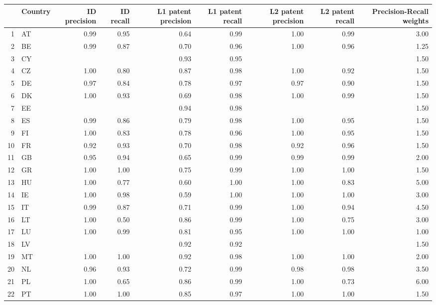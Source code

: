 \begin{table}[ht]
\centering
{\footnotesize
\begin{tabular}{rlrrrrrrr}
  \hline
 & Country & ID precision & ID recall & L1 patent precision & L1 patent recall & L2 patent precision & L2 patent recall & Precision-Recall weights \\ 
  \hline
1 & AT & 0.99 & 0.95 & 0.64 & 0.99 & 1.00 & 0.99 & 3.00 \\ 
  2 & BE & 0.99 & 0.87 & 0.70 & 0.96 & 1.00 & 0.96 & 1.25 \\ 
  3 & CY &  &  & 0.93 & 0.95 &  &  & 1.50 \\ 
  4 & CZ & 1.00 & 0.80 & 0.87 & 0.98 & 1.00 & 0.92 & 1.50 \\ 
  5 & DE & 0.97 & 0.84 & 0.78 & 0.97 & 0.97 & 0.90 & 1.50 \\ 
  6 & DK & 1.00 & 0.93 & 0.69 & 0.98 & 1.00 & 0.99 & 1.50 \\ 
  7 & EE &  &  & 0.94 & 0.98 &  &  & 1.50 \\ 
  8 & ES & 0.99 & 0.86 & 0.79 & 0.98 & 1.00 & 0.95 & 1.50 \\ 
  9 & FI & 1.00 & 0.83 & 0.78 & 0.96 & 1.00 & 0.95 & 1.50 \\ 
  10 & FR & 0.92 & 0.93 & 0.70 & 0.98 & 0.92 & 0.96 & 1.50 \\ 
  11 & GB & 0.95 & 0.94 & 0.65 & 0.99 & 0.99 & 0.99 & 2.00 \\ 
  12 & GR & 1.00 & 1.00 & 0.75 & 0.99 & 1.00 & 1.00 & 1.50 \\ 
  13 & HU & 1.00 & 0.77 & 0.60 & 1.00 & 1.00 & 0.83 & 5.00 \\ 
  14 & IE & 1.00 & 0.98 & 0.59 & 1.00 & 1.00 & 1.00 & 3.00 \\ 
  15 & IT & 0.99 & 0.87 & 0.71 & 0.99 & 1.00 & 0.94 & 4.50 \\ 
  16 & LT & 1.00 & 0.50 & 0.86 & 0.99 & 1.00 & 0.75 & 3.00 \\ 
  17 & LU & 1.00 & 0.99 & 0.81 & 0.95 & 1.00 & 1.00 & 1.00 \\ 
  18 & LV &  &  & 0.92 & 0.92 &  &  & 1.50 \\ 
  19 & MT & 1.00 & 1.00 & 0.92 & 0.98 & 1.00 & 1.00 & 2.00 \\ 
  20 & NL & 0.96 & 0.93 & 0.72 & 0.99 & 0.98 & 0.98 & 3.50 \\ 
  21 & PL & 1.00 & 0.65 & 0.86 & 0.99 & 1.00 & 0.73 & 6.00 \\ 
  22 & PT & 1.00 & 1.00 & 0.85 & 0.97 & 1.00 & 1.00 & 1.50 \\ 

\end{tabular}}
\end{table}
